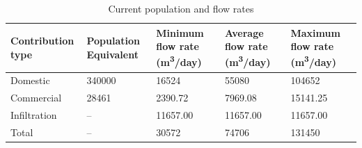 \begin{table}[h]
  \centering
  \caption{Current population and flow rates}
  \label{tab:current_rates}
  \begin{tabular}{|p{3cm}|p{2.5cm}|p{3cm}|p{3cm}|p{3cm}|}
    \hline
    \textbf{Contribution type} & \textbf{Population Equivalent} & \textbf{Minimum flow rate (m\textsuperscript{3}/day)} & \textbf{Average flow rate (m\textsuperscript{3}/day)} & \textbf{Maximum flow rate (m\textsuperscript{3}/day)} \\
    \hline
    Domestic & 340000 & 16524 & 55080 & 104652 \\
    Commercial & 28461 & 2390.72 & 7969.08 & 15141.25 \\
    Infiltration & -- & 11657.00 & 11657.00 & 11657.00 \\
    Total & -- & 30572& 74706 & 131450 \\
    \hline
  \end{tabular}
\end{table}
